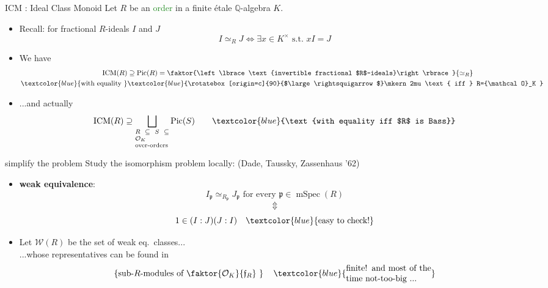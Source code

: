 \documentclass[usenames,dvipsnames]{beamer}
\def\Q{\mathbb{Q}}
\DeclareMathOperator{\ICM}{ICM}
\DeclareMathOperator{\Pic}{Pic}
\DeclareMathOperator{\mSpec}{mSpec}
\newcommand{\cO}{{\mathcal O}}
\newcommand{\cW}{{\mathcal W}}
\newcommand{\p}{{\mathfrak p}}
\newcommand{\frf}{{\mathfrak f}}
\newcommand{\set}[1]{\left\lbrace#1\right\rbrace }
\newcommand{\blue}[1]{\textcolor{blue}{#1}}
\newcommand{\green}[1]{\textcolor{ForestGreen}{#1}}
\begin{document}
\begin{frame}{ICM : Ideal Class Monoid}
Let $R$ be an \green{order} in a finite \'etale  $\Q$-algebra $K$.
\begin{itemize}
   \pause \item Recall: for fractional $R$-ideals $I$ and $J$
	\[ I\simeq_R J \Longleftrightarrow \exists x \in K^\times \text{ s.t.~} xI=J \]
   \pause \item We have
   				\begin{align*}
   					\ICM(R) 	  & \supseteq \Pic(R)=\faktor{\set{\text{invertible fractional $R$-ideals}}}{\simeq_R} \\
	\blue{\text{with equality }} & \blue{\rotatebox[origin=c]{90}{$\large\rightsquigarrow$}\mkern2mu \text{ iff } R=\cO_K }
   				\end{align*}
   \pause \item ...and actually
   \[ \ICM(R) \supseteq \bigsqcup_{\scriptsize\parbox{5 em}{$R\subseteq S \subseteq \cO_K$\\over-orders}}\Pic(S) \qquad \textcolor{blue}{\text{with equality iff $R$ is Bass}} \] 
\end{itemize}
\end{frame}

\begin{frame}{ simplify the problem  }
Study the isomorphism problem locally: (Dade, Taussky, Zassenhaus '62)
\begin{itemize}
\pause \item  \textbf{weak equivalence}:
	\[I_{\p}\simeq_{R_{\p}} J_{\p} \text{ for every } {\p} \in \mSpec(R)\]
\pause \vspace{-6mm}\[\Updownarrow\]
	\[1\in (I:J)(J:I)\quad \textcolor{blue}{\text{easy to check!}}\]
\pause \item Let $\cW(R)$ be the set of weak eq.~classes...\\
\pause ...whose representatives can be found in
	\[\set{\text{sub-$R$-modules of $\faktor{\cO_K}{\frf_R}$ }} \quad \textcolor{blue}{\parbox{10 em}{finite! and most of the time not-too-big ...}}\]
\end{itemize}
\end{frame}
\end{document}
